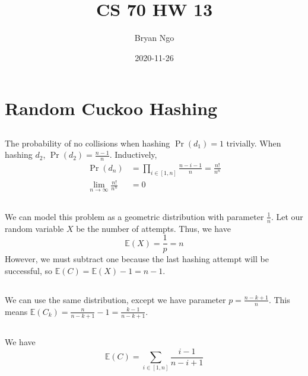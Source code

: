 \documentclass{article}
\title{CS 70 HW 13}
\author{Bryan Ngo}
\date{2020-11-26}
\newcommand{\E}{\mathbb{E}}
\begin{document}
\maketitle

\section{Random Cuckoo Hashing}

\subsection{}

The probability of no collisions when hashing \(\Pr(d_1) = 1\) trivially.
When hashing \(d_2\), \(\Pr(d_2) = \frac{n - 1}{n}\).
Inductively,
\begin{align}
    \Pr(d_n) &= \prod_{i \in [1, n]} \frac{n - i - 1}{n} = \frac{n!}{n^n} \\
    \lim_{n \to \infty} \frac{n!}{n^n} &= 0
\end{align}

\subsection{}

We can model this problem as a geometric distribution with parameter \(\frac{1}{n}\).
Let our random variable \(X\) be the number of attempts.
Thus, we have
\begin{equation}
    \E(X) = \frac{1}{p} = n
\end{equation}
However, we must subtract one because the last hashing attempt will be successful, so \(\E(C) = \E(X) - 1 = n - 1\).

\subsection{}

We can use the same distribution, except we have parameter \(p = \frac{n - k + 1}{n}\).
This means \(\E(C_k) = \frac{n}{n - k + 1} - 1 = \frac{k - 1}{n - k + 1}\).

\subsection{}

We have
\begin{equation}
    \E(C) = \sum_{i \in [1, n]} \frac{i - 1}{n - i + 1}
\end{equation}
\end{document}
